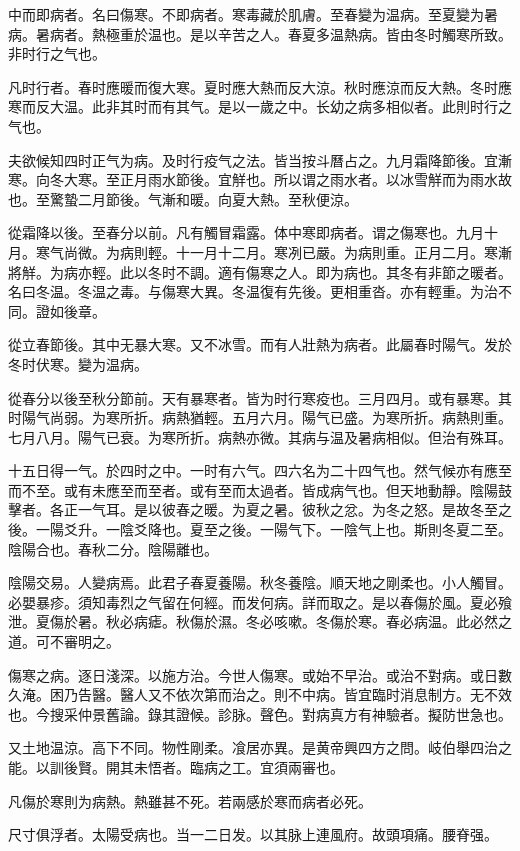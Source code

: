 \documentclass[12pt,twoside,UTF8,b5paper]{ctexbook}
\begin{document}
中而即病者。名曰傷寒。不即病者。寒毒藏於肌膚。至春變为温病。至夏變为暑病。暑病者。熱極重於温也。是以辛苦之人。春夏多温熱病。皆由冬时觸寒所致。非时行之气也。

凡时行者。春时應暖而復大寒。夏时應大熱而反大涼。秋时應涼而反大熱。冬时應寒而反大温。此非其时而有其气。是以一歲之中。长幼之病多相似者。此則时行之气也。

夫欲候知四时正气为病。及时行疫气之法。皆当按斗曆占之。九月霜降節後。宜漸寒。向冬大寒。至正月雨水節後。宜觧也。所以谓之雨水者。以冰雪觧而为雨水故也。至驚蟄二月節後。气漸和暖。向夏大熱。至秋便涼。

從霜降以後。至春分以前。凡有觸冒霜露。体中寒即病者。谓之傷寒也。九月十月。寒气尚微。为病則輕。十一月十二月。寒冽已嚴。为病則重。正月二月。寒漸將觧。为病亦輕。此以冬时不調。適有傷寒之人。即为病也。其冬有非節之暖者。名曰冬温。冬温之毒。与傷寒大異。冬温復有先後。更相重沓。亦有輕重。为治不同。證如後章。

從立春節後。其中无暴大寒。又不冰雪。而有人壯熱为病者。此屬春时陽气。发於冬时伏寒。變为温病。

從春分以後至秋分節前。天有暴寒者。皆为时行寒疫也。三月四月。或有暴寒。其时陽气尚弱。为寒所折。病熱猶輕。五月六月。陽气已盛。为寒所折。病熱則重。七月八月。陽气已衰。为寒所折。病熱亦微。其病与温及暑病相似。但治有殊耳。

十五日得一气。於四时之中。一时有六气。四六名为二十四气也。然气候亦有應至而不至。或有未應至而至者。或有至而太過者。皆成病气也。但天地動靜。陰陽鼓擊者。各正一气耳。是以彼春之暖。为夏之暑。彼秋之忿。为冬之怒。是故冬至之後。一陽爻升。一陰爻降也。夏至之後。一陽气下。一陰气上也。斯則冬夏二至。陰陽合也。春秋二分。陰陽離也。

陰陽交易。人變病焉。此君子春夏養陽。秋冬養陰。順天地之剛柔也。小人觸冒。必嬰暴疹。須知毒烈之气留在何經。而发何病。詳而取之。是以春傷於風。夏必飱泄。夏傷於暑。秋必病瘧。秋傷於濕。冬必咳嗽。冬傷於寒。春必病温。此必然之道。可不審明之。

傷寒之病。逐日淺深。以施方治。今世人傷寒。或始不早治。或治不對病。或日數久淹。困乃告醫。醫人又不依次第而治之。則不中病。皆宜臨时消息制方。无不效也。今搜采仲景舊論。錄其證候。診脉。聲色。對病真方有神驗者。擬防世急也。

又土地温涼。高下不同。物性剛柔。飡居亦異。是黄帝興四方之問。岐伯舉四治之能。以訓後賢。開其未悟者。臨病之工。宜須兩審也。

凡傷於寒則为病熱。熱雖甚不死。若兩感於寒而病者必死。

尺寸俱浮者。太陽受病也。当一二日发。以其脉上連風府。故頭項痛。腰脊强。
\end{document}
